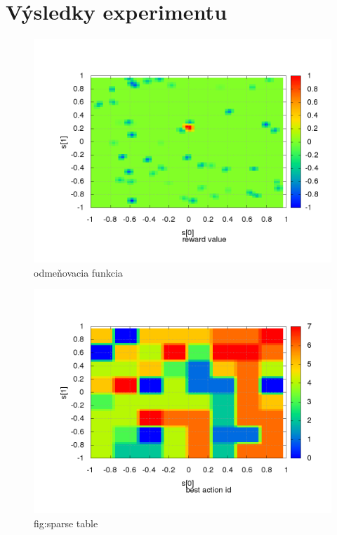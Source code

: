\section {Výsledky experimentu}



\begin{figure}[!htb]
\centering
\includegraphics[scale=.4]{../../results_q_learning/map_1/reward_value_surface.png}
\caption{odmeňovacia funkcia}
\end{figure}



\begin{figure}[!htb]
\centering
\includegraphics[scale=.4]{../../results_q_learning/map_1/function_type_1/iterations_10/action_best_value_log_surface.png}
\caption{fig:sparse table}
\end{figure}

